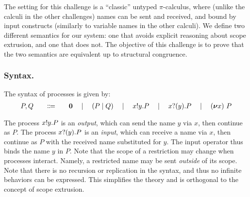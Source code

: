\documentclass[runningheads]{llncs}
\begin{document}
The setting for this challenge is a ``classic'' untyped \( \pi \)-calculus, where (unlike the calculi in the other challenges) names can be sent and received, and bound by input constructs (similarly to variable names in the other calculi).
We define two different semantics for our system: one that avoids explicit reasoning about scope extrusion, and one that does not.
The objective of this challenge is to prove that the two semantics are equivalent up to structural congruence.

\subsubsection{Syntax.}
The syntax of processes is given by:
\[
\begin{array}{r@{\qquad}c@{\qquad}l}
  P,Q & \Coloneqq & \Pend \quad\mid\quad \PBpar{P}{Q} \quad\mid\quad \Pout{x}{y}{P} \quad\mid\quad \Pin{x}{y}{P} \quad\mid\quad \Pres{x}{P}
\end{array}
\]


The process \( x ! y . P \) is an \emph{output}, which can send the name \( y \) via \( x \), then continue as \( P \).
The process \( x ? (y) . P \) is an \emph{input}, which can receive a name via \( x \), then continue as \( P \) with the received name substituted for \( y \).
The input operator thus binds the name \( y \) in \( P \).
Note that the scope of a restriction may change when processes interact. Namely, a restricted name may be sent \emph{outside} of its scope.
Note that there is no recursion or replication in the syntax, and thus no infinite behaviors can be expressed.
This simplifies the theory and is orthogonal to the concept of scope extrusion.

\end{document}
